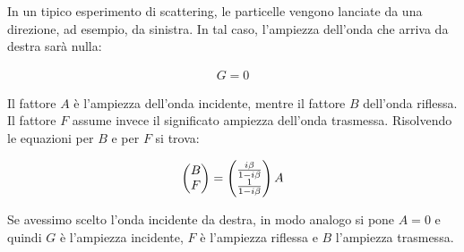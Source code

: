 \begin{itemize}
	\vspace{1em}
		
		In un tipico esperimento di scattering, le particelle vengono lanciate da una direzione, ad esempio, da sinistra. In tal caso, l'ampiezza dell'onda che arriva da destra sarà nulla:
		
	\begin{align*}
		G = 0
	\end{align*}
	
		Il fattore $A$ è l'ampiezza dell'onda incidente, mentre il fattore $B$ dell'onda riflessa. Il fattore $F$ assume invece il significato ampiezza dell'onda trasmessa. Risolvendo le equazioni per $B$ e per $F$ si trova:
		
	\begin{align*}
		\mqty(B \\ F) = \mqty(\frac{i \beta}{1 - i \beta } \\ \frac{1}{1 - i \beta }) \, A
	\end{align*}
		
		Se avessimo scelto l'onda incidente da destra, in modo analogo si pone $A = 0$ e quindi $G$ è l'ampiezza incidente, $F$ è l'ampiezza riflessa e $B$ l'ampiezza trasmessa.
		
\end{itemize}

